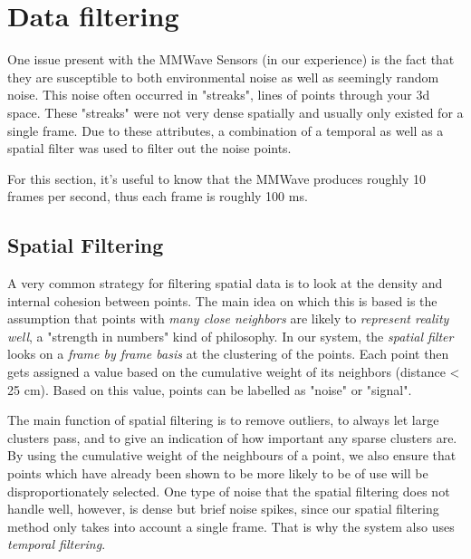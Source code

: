 \section{Data filtering}
\label{section: tracking method - data filtering}

One issue present with the MMWave Sensors (in our experience) is the fact that they are susceptible to both environmental noise as well as seemingly random noise. 
This noise often occurred in "streaks", lines of points through your 3d space. 
These "streaks" were not very dense spatially and usually only existed for a single frame.
Due to these attributes, a combination of a temporal as well as a spatial filter was used to filter out the noise points.

For this section, it's useful to know that the MMWave produces roughly 10 frames per second, thus each frame is roughly 100 ms.

\subsection{Spatial Filtering}
\label{sub-section: tracking method - data filtering - density filtering}

A very common strategy for filtering spatial data is to look at the density and internal cohesion between points.
The main idea on which this is based is the assumption that points with \textit{many close neighbors} are likely to \textit{represent reality well}, a "strength in numbers" kind of philosophy.
In our system, the \textit{spatial filter} looks on a \textit{frame by frame basis} at the clustering of the points.
Each point then gets assigned a value based on the cumulative weight of its neighbors (distance < 25 cm). 
Based on this value, points can be labelled as "noise" or "signal".

The main function of spatial filtering is to remove outliers, to always let large clusters pass, and to give an indication of how important any sparse clusters are.
By using the cumulative weight of the neighbours of a point, we also ensure that points which have already been shown to be more likely to be of use will be disproportionately selected.
One type of noise that the spatial filtering does not handle well, however, is dense but brief noise spikes, since our spatial filtering method only takes into account a single frame.
That is why the system also uses \textit{temporal filtering}.




